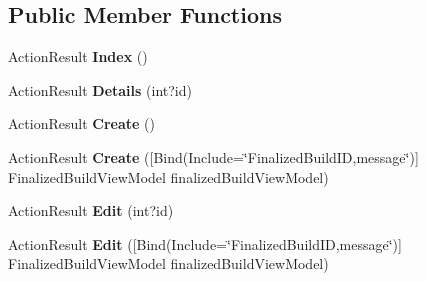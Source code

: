 \subsection*{Public Member Functions}
\begin{DoxyCompactItemize}
\item 
Action\+Result {\bfseries Index} ()\hypertarget{class_p_c_builder_m_v_c_1_1_controllers_1_1_finalized_build_controller_a242b5e426f4bc1c73fe627d400281f9e}{}\label{class_p_c_builder_m_v_c_1_1_controllers_1_1_finalized_build_controller_a242b5e426f4bc1c73fe627d400281f9e}

\item 
Action\+Result {\bfseries Details} (int?id)\hypertarget{class_p_c_builder_m_v_c_1_1_controllers_1_1_finalized_build_controller_a35dc61bcca940b614aab3c965bc0d2c9}{}\label{class_p_c_builder_m_v_c_1_1_controllers_1_1_finalized_build_controller_a35dc61bcca940b614aab3c965bc0d2c9}

\item 
Action\+Result {\bfseries Create} ()\hypertarget{class_p_c_builder_m_v_c_1_1_controllers_1_1_finalized_build_controller_a6bf70278e044bfd5e3f88ee514fb2249}{}\label{class_p_c_builder_m_v_c_1_1_controllers_1_1_finalized_build_controller_a6bf70278e044bfd5e3f88ee514fb2249}

\item 
Action\+Result {\bfseries Create} (\mbox{[}Bind(Include=\char`\"{}Finalized\+Build\+ID,message\char`\"{})\mbox{]} Finalized\+Build\+View\+Model finalized\+Build\+View\+Model)\hypertarget{class_p_c_builder_m_v_c_1_1_controllers_1_1_finalized_build_controller_ad7c02b253a9d65c0af1d2c8291bde7c7}{}\label{class_p_c_builder_m_v_c_1_1_controllers_1_1_finalized_build_controller_ad7c02b253a9d65c0af1d2c8291bde7c7}

\item 
Action\+Result {\bfseries Edit} (int?id)\hypertarget{class_p_c_builder_m_v_c_1_1_controllers_1_1_finalized_build_controller_a2060f2af464247f5856255019afd972c}{}\label{class_p_c_builder_m_v_c_1_1_controllers_1_1_finalized_build_controller_a2060f2af464247f5856255019afd972c}

\item 
Action\+Result {\bfseries Edit} (\mbox{[}Bind(Include=\char`\"{}Finalized\+Build\+ID,message\char`\"{})\mbox{]} Finalized\+Build\+View\+Model finalized\+Build\+View\+Model)\hypertarget{class_p_c_builder_m_v_c_1_1_controllers_1_1_finalized_build_controller_ab758e591d4fbd3f8735ff9b6d4b80974}{}\label{class_p_c_builder_m_v_c_1_1_controllers_1_1_finalized_build_controller_ab758e591d4fbd3f8735ff9b6d4b80974}


\end{DoxyCompactItemize}
